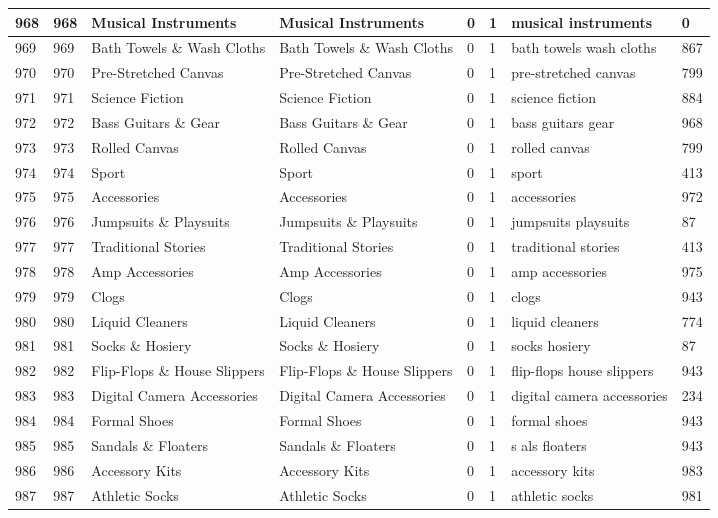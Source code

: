 \begin{longtable}{|l|l|l|l|l|l|l|l|}
968 & 968 & Musical Instruments & Musical Instruments & 0 & 1 & musical instruments & 0 \\ \hline 
969 & 969 & Bath Towels \& Wash Cloths & Bath Towels \& Wash Cloths & 0 & 1 & bath towels wash cloths & 867 \\ \hline 
970 & 970 & Pre-Stretched Canvas & Pre-Stretched Canvas & 0 & 1 & pre-stretched canvas & 799 \\ \hline 
971 & 971 & Science Fiction & Science Fiction & 0 & 1 & science fiction & 884 \\ \hline 
972 & 972 & Bass Guitars \& Gear & Bass Guitars \& Gear & 0 & 1 & bass guitars gear & 968 \\ \hline 
973 & 973 & Rolled Canvas & Rolled Canvas & 0 & 1 & rolled canvas & 799 \\ \hline 
974 & 974 & Sport & Sport & 0 & 1 & sport & 413 \\ \hline 
975 & 975 & Accessories & Accessories & 0 & 1 & accessories & 972 \\ \hline 
976 & 976 & Jumpsuits \& Playsuits & Jumpsuits \& Playsuits & 0 & 1 & jumpsuits playsuits & 87 \\ \hline 
977 & 977 & Traditional Stories & Traditional Stories & 0 & 1 & traditional stories & 413 \\ \hline 
978 & 978 & Amp Accessories & Amp Accessories & 0 & 1 & amp accessories & 975 \\ \hline 
979 & 979 & Clogs & Clogs & 0 & 1 & clogs & 943 \\ \hline 
980 & 980 & Liquid Cleaners & Liquid Cleaners & 0 & 1 & liquid cleaners & 774 \\ \hline 
981 & 981 & Socks \& Hosiery & Socks \& Hosiery & 0 & 1 & socks hosiery & 87 \\ \hline 
982 & 982 & Flip-Flops \& House Slippers & Flip-Flops \& House Slippers & 0 & 1 & flip-flops house slippers & 943 \\ \hline 
983 & 983 & Digital Camera Accessories & Digital Camera Accessories & 0 & 1 & digital camera accessories & 234 \\ \hline 
984 & 984 & Formal Shoes & Formal Shoes & 0 & 1 & formal shoes & 943 \\ \hline 
985 & 985 & Sandals \& Floaters & Sandals \& Floaters & 0 & 1 & s als floaters & 943 \\ \hline 
986 & 986 & Accessory Kits & Accessory Kits & 0 & 1 & accessory kits & 983 \\ \hline 
987 & 987 & Athletic Socks & Athletic Socks & 0 & 1 & athletic socks & 981 \\ \hline 

\end{longtable}
